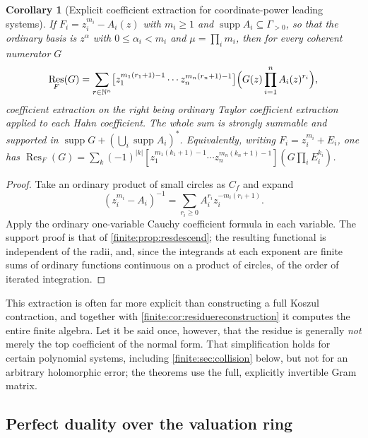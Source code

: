 \documentclass[11pt,letterpaper]{article}
\newtheorem{corollary}[theorem]{Corollary}
\theoremstyle{definition}
\theoremstyle{remark}
\newcommand{\N}{\mathbb N}
\DeclareMathOperator{\supp}{supp}
\DeclareMathOperator{\Res}{Res}
\numberwithin{equation}{section}
\begin{document}
\begin{corollary}[Explicit coefficient extraction for coordinate-power leading systems]
\label{finite:cor:coefficientresidue}
If $F_i=z_i^{m_i}-A_i(z)$ with $m_i\geq1$ and $\supp A_i\subseteq\Gamma_{>0}$, so that the ordinary basis is $z^\alpha$ with $0\leq\alpha_i<m_i$ and $\mu=\prod_im_i$, then for every coherent numerator $G$
\begin{equation}\label{finite:eq:coefficientresidue}
 \Res_F(G)=\sum_{r\in\N^n}
 \bigl[z_1^{m_1(r_1+1)-1}\cdots z_n^{m_n(r_n+1)-1}\bigr]
 \Bigl(G(z)\prod_{i=1}^nA_i(z)^{r_i}\Bigr),
\end{equation}
coefficient extraction on the right being ordinary Taylor coefficient extraction applied to each Hahn coefficient. The whole sum is strongly summable and supported in $\supp G+(\bigcup_i\supp A_i)^*$. Equivalently, writing $F_i=z_i^{m_i}+E_i$, one has $\Res_F(G)=\sum_k(-1)^{|k|}[z_1^{m_1(k_1+1)-1}\cdots z_n^{m_n(k_n+1)-1}](G\prod_iE_i^{k_i})$.
\end{corollary}

\begin{proof}
Take an ordinary product of small circles as $C_f$ and expand
\[
 (z_i^{m_i}-A_i)^{-1}=\sum_{r_i\geq0}A_i^{r_i}z_i^{-m_i(r_i+1)}.
\]
Apply the ordinary one-variable Cauchy coefficient formula in each variable. The support proof is that of \cref{finite:prop:resdescend}; the resulting functional is independent of the radii, and, since the integrands at each exponent are finite sums of ordinary functions continuous on a product of circles, of the order of iterated integration.
\end{proof}

This extraction is often far more explicit than constructing a full Koszul contraction, and together with \cref{finite:cor:residuereconstruction} it computes the entire finite algebra. Let it be said once, however, that the residue is generally \emph{not} merely the top coefficient of the normal form. That simplification holds for certain polynomial systems, including \cref{finite:sec:collision} below, but not for an arbitrary holomorphic error; the theorems use the full, explicitly invertible Gram matrix.

\subsection{Perfect duality over the valuation ring}
\label{finite:sec:duality}
\end{document}
